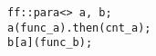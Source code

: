   \begin{lstlisting}[mathescape]
ff::para<> a, b;
a(func_a).then(cnt_a);
b[a](func_b);
  \end{lstlisting}
